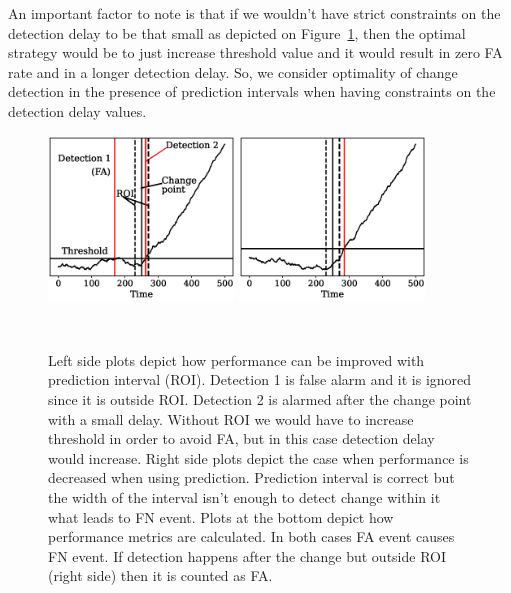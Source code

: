 An important factor to note is that if we wouldn't have strict constraints on the detection delay to be that small as depicted on Figure~\ref{fig:possible_outcomes}, then the optimal strategy would be to just increase threshold value and it would result in zero FA rate and in a longer detection delay.
So, we consider optimality of change detection in the presence of prediction intervals when having constraints on the detection delay values.
\begin{figure}[!htb]
	\begin{minipage}[t]{1.0\textwidth}
    \centering
    \includegraphics[width=0.44\textwidth, trim={1.5cm 1.0cm 0.3cm 1.0cm}]{articles/pics/journal_paper/proof_of_concept2.eps}
    \includegraphics[width=0.44\textwidth, trim={1.5cm 1.0cm 0.3cm 1.0cm}]{articles/pics/journal_paper/proof_of_concept2_fn_case.eps}
    \\
		
    \hspace{10mm}
		
		\caption{
    Left side plots depict how performance can be improved with prediction interval (ROI). 
    Detection 1 is false alarm and it is ignored since it is outside ROI. 
    Detection 2 is alarmed after the change point with a small delay. 
    Without ROI we would have to increase threshold in order to avoid FA, but in this case detection delay would increase.
    Right side plots depict the case when performance is decreased when using prediction. Prediction interval is correct but the width of the interval isn't enough to detect change within it what leads to FN event. 
    Plots at the bottom depict how performance metrics are calculated.
    In both cases FA event causes FN event.
    If detection happens after the change but outside ROI (right side) then it is counted as FA.
    }~\label{fig:possible_outcomes}
	\end{minipage}
\end{figure}


